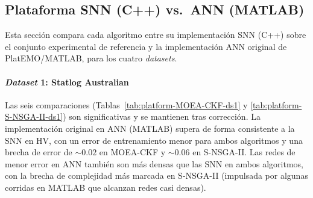\subsection{Plataforma SNN (C++) vs.\ ANN (MATLAB)}
\label{sec:experimento2}

Esta sección compara cada algoritmo entre su implementación SNN (C++) sobre el conjunto experimental de referencia y la implementación ANN original de PlatEMO/MATLAB, para los cuatro \textit{datasets}.

\paragraph{\textit{Dataset} 1: Statlog Australian}
\label{sec:ds1-plataforma}
Las seis comparaciones (Tablas~\ref{tab:platform-MOEA-CKF-ds1} y \ref{tab:platform-S-NSGA-II-ds1}) son significativas y se mantienen tras corrección. La implementación original en ANN (MATLAB) supera de forma consistente a la SNN en HV, con un error de entrenamiento menor para ambos algoritmos y una brecha de error de $\sim0.02$ en MOEA-CKF y $\sim0.06$ en S-NSGA-II. Las redes de menor error en ANN también son más densas que las SNN en ambos algoritmos, con la brecha de complejidad más marcada en S-NSGA-II (impulsada por algunas corridas en MATLAB que alcanzan redes casi densas).

